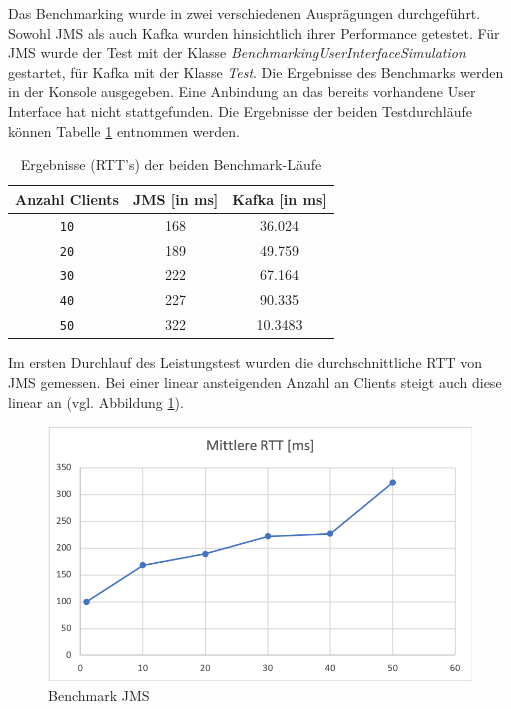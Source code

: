 \documentclass[10pt,journal,compsoc]{IEEEtran}
\begin{document}
Das Benchmarking wurde in zwei verschiedenen Ausprägungen durchgeführt. Sowohl JMS als auch Kafka wurden hinsichtlich ihrer Performance getestet. Für JMS wurde der Test mit der Klasse \textit{BenchmarkingUserInterfaceSimulation} gestartet, für Kafka mit der Klasse \textit{Test}. Die Ergebnisse des Benchmarks werden in der Konsole ausgegeben. Eine Anbindung an das bereits vorhandene User Interface hat nicht stattgefunden. Die Ergebnisse der beiden Testdurchläufe können Tabelle \ref{tab:Benchmark} entnommen werden. 

\begin{table}[h!]
	\caption{Ergebnisse (RTT's) der beiden Benchmark-Läufe}
	\label{tab:Benchmark}
	\def\arraystretch{1,2} %
	\centering
	\begin{tabular}{|c||c||c|}\hline
		\textbf{Anzahl Clients} & \textbf{JMS [in ms]} & \textbf{Kafka [in ms]} \\\hline
		\lstinline|10|          & 168   & 36.024 \\\hline	
		\lstinline|20|      	& 189	& 49.759   \\\hline
		\lstinline|30|        	& 222	& 67.164	\\\hline
		\lstinline|40|       	& 227  	& 90.335    \\\hline
		\lstinline|50|       	& 322   & 10.3483   \\\hline
	\end{tabular} 
\end{table}

Im ersten Durchlauf des Leistungstest wurden die durchschnittliche RTT von JMS gemessen. Bei einer linear ansteigenden Anzahl an Clients steigt auch diese linear an (vgl. Abbildung \ref{fig:RTT_JMS}).
\\

\begin{figure}[h]
	\centering
	\includegraphics[scale=0.5]{Bilder/RTT_JMS.PNG}
	\caption{Benchmark JMS}
	\label{fig:RTT_JMS}
\end{figure}
\end{document}
